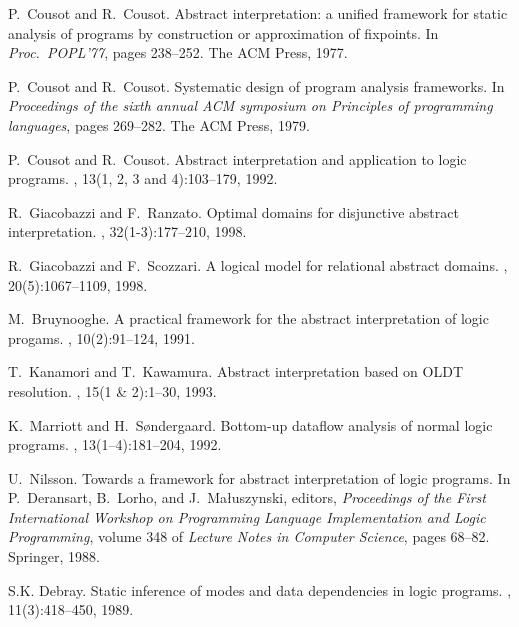 \documentclass{llncs}
\begin{document}
\begin{thebibliography}{10}

P.~Cousot and R.~Cousot.
\newblock Abstract interpretation: a unified framework for static analysis of
  programs by construction or approximation of fixpoints.
\newblock In {\em Proc.~POPL'77}, pages 238--252. The ACM Press, 1977.

P.~Cousot and R.~Cousot.
\newblock Systematic design of program analysis frameworks.
\newblock In {\em Proceedings of the sixth annual ACM symposium on Principles
  of programming languages}, pages 269--282. The ACM Press, 1979.

P.~Cousot and R.~Cousot.
\newblock Abstract interpretation and application to logic programs.
, 13(1, 2, 3 and 4):103--179, 1992.

R.~Giacobazzi and F.~Ranzato.
\newblock Optimal domains for disjunctive abstract interpretation.
, 32(1-3):177--210, 1998.

R.~Giacobazzi and F.~Scozzari.
\newblock A logical model for relational abstract domains.
,
  20(5):1067--1109, 1998.

M.~Bruynooghe.
\newblock A practical framework for the abstract interpretation of logic
  progams.
, 10(2):91--124, 1991.

T.~Kanamori and T.~Kawamura.
\newblock Abstract interpretation based on {OLDT} resolution.
, 15(1 \& 2):1--30, 1993.

K.~Marriott and H.~S{\o}ndergaard.
\newblock Bottom-up dataflow analysis of normal logic programs.
, 13(1--4):181--204, 1992.

U.~Nilsson.
\newblock Towards a framework for abstract interpretation of logic programs.
\newblock In P.~Deransart, B.~Lorho, and J.~Ma{\l}uszynski, editors, {\em
  Proceedings of the First International Workshop on Programming Language
  Implementation and Logic Programming}, volume 348 of {\em Lecture Notes in
  Computer Science}, pages 68--82. Springer, 1988.



S.K. Debray.
\newblock Static inference of modes and data dependencies in logic programs.
,
  11(3):418--450, 1989.


\end{thebibliography}
\end{document}
